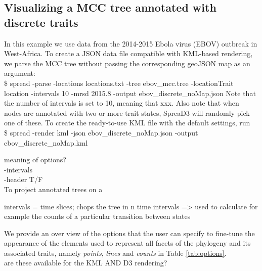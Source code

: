 \documentclass[english]{paper}
\begin{document}
\subsection{Visualizing a MCC tree annotated with discrete traits}
% 
% 


In this example we use data from the 2014-2015 Ebola virus (EBOV) outbreak in West-Africa. 
To create a JSON data file compatible with KML-based rendering, we parse the MCC tree without passing the corresponding geoJSON map as an argument:
\\
\$ spread -parse -locations locations.txt -tree ebov\_mcc.tree -locationTrait location -intervals 10 -mrsd 2015.8 -output ebov\_discrete\_noMap.json
Note that the number of intervals is set to 10, meaning that xxx.
Also note that when nodes are annotated with two or more trait states, SpreaD3 will randomly pick one of these.  
To create the ready-to-use KML file with the default settings, run
\\
\$ spread -render kml -json ebov\_discrete\_noMap.json -output ebov\_discrete\_noMap.kml
\par
meaning of options?
\\-intervals
\\-header T/F
\\
To project annotated trees on a

intervals = time slices; chops the tree in n time intervals => used to calculate for example the counts of a particular transition between states
 
\par
We provide an over view of the options that the user can specify to fine-tune the appearance of the elements used to represent all facets of the phylogeny and its associated traits, namely \textit{points}, \textit{lines} and \textit{counts} in Table \ref{tab:options}.
\\are these available for the KML AND D3 rendering?
\end{document}
